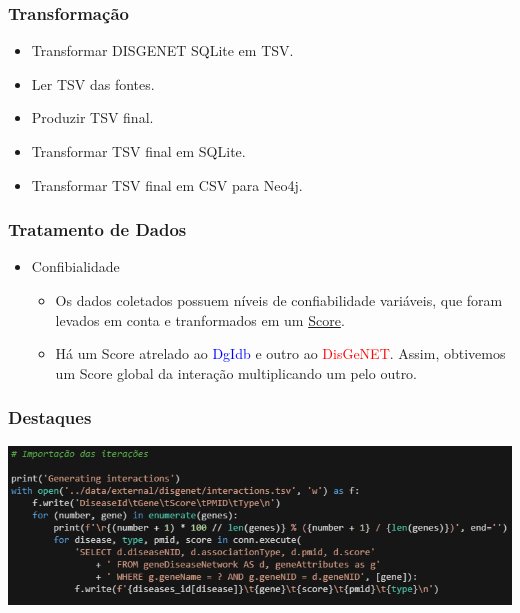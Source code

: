 \documentclass[12pt]{beamer}
\begin{document}
\begin{frame}
  \frametitle{Transformação}

  \begin{itemize}
    \item Transformar DISGENET SQLite em TSV.
    \item Ler TSV das fontes.
    \item Produzir TSV final.
    \item Transformar TSV final em SQLite.
    \item Transformar TSV final em CSV para Neo4j.
  \end{itemize}
\end{frame}

\begin{frame}
  \frametitle{Tratamento de Dados}
  
  \begin{itemize}
    \item Confibialidade
    \begin{itemize}
      \item Os dados coletados possuem níveis de confiabilidade
      variáveis, que foram levados em conta e tranformados em um \underline{Score}.
      \item Há um Score atrelado ao \textcolor{blue}{DgIdb} e outro ao \textcolor{red}{DisGeNET}. Assim, obtivemos um Score global da interação multiplicando um pelo outro.      
    \end{itemize}
  \end{itemize}
\end{frame}

\begin{frame}
  \frametitle{Destaques}

  \centering
  \includegraphics[scale=0.5]{c1}
\end{frame}
\end{document}
